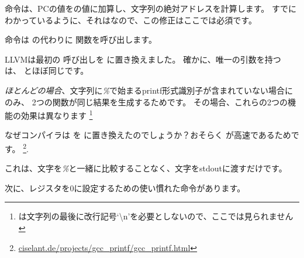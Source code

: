 命令は、\ac{PC}の値をの値に加算し、文字列の絶対アドレスを計算します。 
すでにわかっているように、それはなので、この修正はここでは必須です。

命令は \printf の代わりに \puts 関数を呼び出します。

\label{puts}

LLVMは最初の \printf 呼び出しを \puts に置き換えました。 
確かに、唯一の引数を持つ \printf は、 \puts とほぼ同じです。

\emph{ほとんどの場合}、文字列に\emph{\%}で始まるprintf形式識別子が含まれていない場合にのみ、
2つの関数が同じ結果を生成するためです。 その場合、これらの2つの機能の効果は異なります
\footnote{ \puts は文字列の最後に改行記号`\textbackslash{}n'を必要としないので、ここでは見られません}

なぜコンパイラは \printf を \puts に置き換えたのでしょうか？おそらく \puts が高速であるためです。
\footnote{\href{http://www.ciselant.de/projects/gcc_printf/gcc_printf.html}{ciselant.de/projects/gcc\_printf/gcc\_printf.html}}. 

これは、文字を\emph{\%}と一緒に比較することなく、文字を\gls{stdout}に渡すだけです。

次に、レジスタを0に設定するための使い慣れた命令があります。
